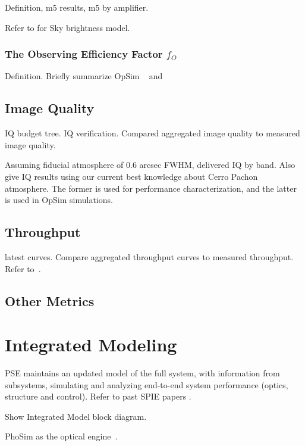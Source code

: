 Definition, m5 results, m5 by amplifier.

Refer to \cite{2016SPIE.9910E..1AY} for Sky brightness model.

\subsubsection{The Observing Efficiency Factor $f_O$}

Definition. Briefly summarize OpSim ~\cite{PSTN-007} and \cite{PSTN-043}

\subsection{Image Quality}

IQ budget tree. IQ verification. Compared aggregated image quality to measured image quality.

Assuming fiducial atmosphere of 0.6 arcsec FWHM, delivered IQ by band.
Also give IQ results using our current best knowledge about Cerro Pachon atmosphere.
The former is used for performance characterization, and the latter is used in OpSim simulations.

\subsection{Throughput}

latest curves. Compare aggregated throughput curves to measured throughput. Refer to~\cite{PSTN-027}.

\subsection{Other Metrics}

\section{Integrated Modeling}

PSE maintains an updated model of the full system, with information from subsystems,
simulating and analyzing end-to-end system performance (optics, structure and control).
Refer to past SPIE papers \cite{2016SPIE.9911E..18A, 2018SPIE10705E..0PX}.

Show Integrated Model block diagram.

PhoSim as the optical engine~\cite{2015ApJS..218...14P}.



